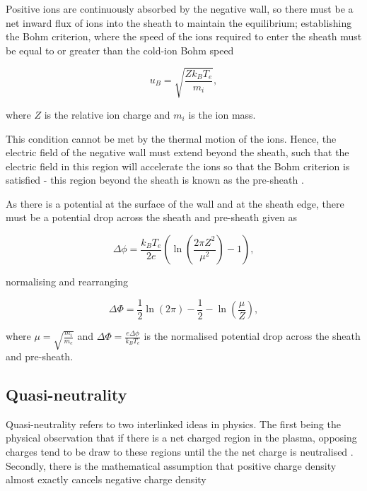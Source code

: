 \documentclass[journal]{Imperial_lab_report}
\begin{document}
\smallskip

Positive ions are continuously absorbed by the negative wall, so there must be a net inward flux of ions into the sheath to maintain the equilibrium; establishing the Bohm criterion, where the speed of the ions required to enter the sheath must be equal to or greater than the cold-ion Bohm speed

\begin{equation}\label{eq:Bohm}
u_{B} = \sqrt{\frac{Z k_{B} T_{e}}{m_{i}}},
\end{equation}

\noindent where $Z$ is the relative ion charge and $m_i$ is the ion mass.

\smallskip

This condition cannot be met by the thermal motion of the ions. Hence, the electric field of the negative wall must extend beyond the sheath, such that the electric field in this region will accelerate the ions so that the Bohm criterion is satisfied - this region beyond the sheath is known as the pre-sheath \cite{Willis}.

\smallskip 

As there is a potential at the surface of the wall and at the sheath edge, there must be a potential drop across the sheath and pre-sheath given as 

\begin{equation}\label{eq:PlanarlimOriginal}
\Delta \phi = \frac{k_B T_e}{2 e}\left(\ln{\left(\frac{2 \pi Z^2}{\mu^2} \right)} - 1\right),
\end{equation}

\noindent normalising and rearranging 

\begin{equation}\label{eq:Planarlim}
{\Delta \Phi = \frac{1}{2}\ln{\left(2 \pi \right)} - \frac{1}{2} - \ln{\left(\frac{\mu}{Z} \right)}},
\end{equation}

\noindent where $\mu = \sqrt{\frac{m_i}{m_e}}$ and $\Delta \Phi = \frac{e \Delta \phi }{k_{B} T_{e}}$ is the normalised potential drop across the sheath and pre-sheath.

\subsection{Quasi-neutrality}

\medskip

Quasi-neutrality refers to two interlinked ideas in physics. The first being the physical observation that if there is a net charged region in the plasma, opposing charges tend to be draw to these regions until the the net charge is neutralised \cite{Thomas}. Secondly, there is the mathematical assumption that positive charge density almost exactly cancels negative charge density \cite{Thomas} 
\end{document}
